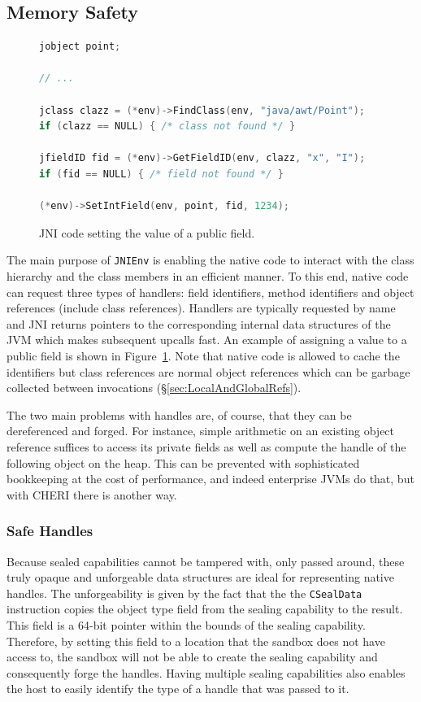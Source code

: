 \documentclass[a4paper,12pt,twoside,openright]{report}
\newcommand{\insn}[1]{\texttt{#1}}
\newcommand{\keyword}[1]{\textsf{#1}}
\begin{document}
\subsection{Memory Safety}
\label{sec:MemorySafety}

\begin{figure}[t]
	\begin{lstlisting}[language=C]
jobject point;

// ...

jclass clazz = (*env)->FindClass(env, "java/awt/Point");
if (clazz == NULL) { /* class not found */ }

jfieldID fid = (*env)->GetFieldID(env, clazz, "x", "I");
if (fid == NULL) { /* field not found */ }

(*env)->SetIntField(env, point, fid, 1234);
	\end{lstlisting}
	\caption{JNI code setting the value of a public field.}
	\label{listing:SetFieldValue}
\end{figure}

The main purpose of \texttt{JNIEnv} is enabling the native code to interact with the class hierarchy and the class members in an efficient manner. To this end, native code can request three types of handlers: field identifiers, method identifiers and object references (include class references). Handlers are typically requested by name and JNI returns pointers to the corresponding internal data structures of the JVM which makes subsequent upcalls fast. An example of assigning a value to a \keyword{public} field is shown in Figure~\ref{listing:SetFieldValue}. Note that native code is allowed to cache the identifiers but class references are normal object references which can be garbage collected between invocations (\S\ref{sec:LocalAndGlobalRefs}). 

The two main problems with handles are, of course, that they can be dereferenced and forged. For instance, simple arithmetic on an existing object reference suffices to access its private fields as well as compute the handle of the following object on the heap. This can be prevented with sophisticated bookkeeping at the cost of performance, and indeed enterprise JVMs do that, but with CHERI there is another way. 

\subsubsection{Safe Handles}

Because sealed capabilities cannot be tampered with, only passed around, these truly opaque and unforgeable data structures are ideal for representing native handles. The unforgeability is given by the fact that the the \insn{CSealData} instruction copies the object type field from the sealing capability to the result. This field is a 64-bit pointer within the bounds of the sealing capability. Therefore, by setting this field to a location that the sandbox does not have access to, the sandbox will not be able to create the sealing capability and consequently forge the handles. Having multiple sealing capabilities also enables the host to easily identify the type of a handle that was passed to it.
\end{document}
